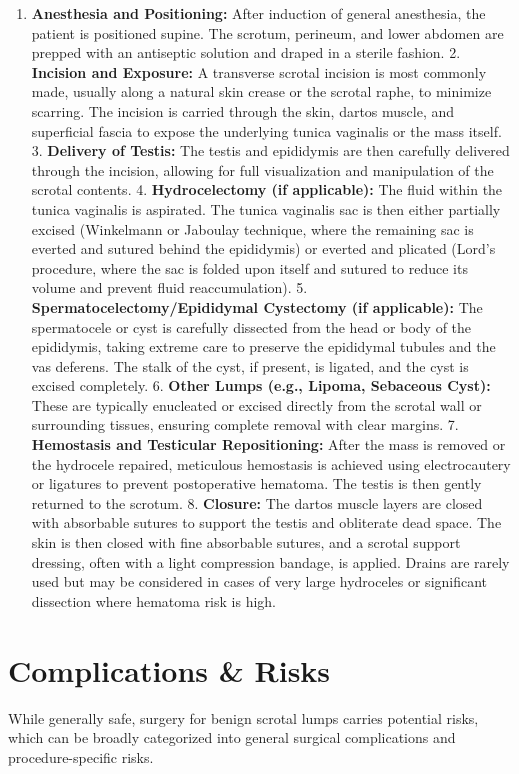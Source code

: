\begin{enumerate}
  \item  \textbf{Anesthesia and Positioning:} After induction of general anesthesia, the patient is positioned supine. The scrotum, perineum, and lower abdomen are prepped with an antiseptic solution and draped in a sterile fashion.
  2.  \textbf{Incision and Exposure:} A transverse scrotal incision is most commonly made, usually along a natural skin crease or the scrotal raphe, to minimize scarring. The incision is carried through the skin, dartos muscle, and superficial fascia to expose the underlying tunica vaginalis or the mass itself.
  3.  \textbf{Delivery of Testis:} The testis and epididymis are then carefully delivered through the incision, allowing for full visualization and manipulation of the scrotal contents.
  4.  \textbf{Hydrocelectomy (if applicable):} The fluid within the tunica vaginalis is aspirated. The tunica vaginalis sac is then either partially excised (Winkelmann or Jaboulay technique, where the remaining sac is everted and sutured behind the epididymis) or everted and plicated (Lord's procedure, where the sac is folded upon itself and sutured to reduce its volume and prevent fluid reaccumulation).
  5.  \textbf{Spermatocelectomy/Epididymal Cystectomy (if applicable):} The spermatocele or cyst is carefully dissected from the head or body of the epididymis, taking extreme care to preserve the epididymal tubules and the vas deferens. The stalk of the cyst, if present, is ligated, and the cyst is excised completely.
  6.  \textbf{Other Lumps (e.g., Lipoma, Sebaceous Cyst):} These are typically enucleated or excised directly from the scrotal wall or surrounding tissues, ensuring complete removal with clear margins.
  7.  \textbf{Hemostasis and Testicular Repositioning:} After the mass is removed or the hydrocele repaired, meticulous hemostasis is achieved using electrocautery or ligatures to prevent postoperative hematoma. The testis is then gently returned to the scrotum.
  8.  \textbf{Closure:} The dartos muscle layers are closed with absorbable sutures to support the testis and obliterate dead space. The skin is then closed with fine absorbable sutures, and a scrotal support dressing, often with a light compression bandage, is applied. Drains are rarely used but may be considered in cases of very large hydroceles or significant dissection where hematoma risk is high.
\end{enumerate}

\section*{Complications \& Risks}
While generally safe, surgery for benign scrotal lumps carries potential risks, which can be broadly categorized into general surgical complications and procedure-specific risks.

